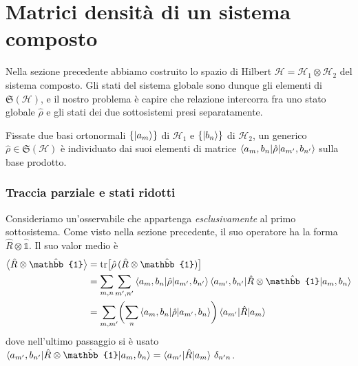 
\chapter{Matrici densità di un sistema composto}

Nella sezione precedente abbiamo costruito lo spazio di Hilbert
$\mathcal{H} = \mathcal{H}_1 \otimes \mathcal{H}_2$ del sistema composto.
Gli stati del sistema globale sono dunque gli elementi di
$\mathfrak{S}(\mathcal{H})$, e il nostro problema è capire che relazione
intercorra fra uno stato globale $\hat{\rho}$ e gli stati dei due
sottosistemi presi separatamente.

Fissate due basi ortonormali $\{\ket{a_m}\}$ di $\mathcal{H}_1$ e
$\{\ket{b_n}\}$ di $\mathcal{H}_2$, un generico $\hat{\rho} \in
\mathfrak{S}(\mathcal{H})$ è individuato dai suoi elementi di matrice
$\braket{a_m, b_n | \hat{\rho} | a_{m'}, b_{n'}}$ sulla base prodotto.

\subsection{Traccia parziale e stati ridotti}

Consideriamo un'osservabile che appartenga \emph{esclusivamente} al primo
sottosistema. Come visto nella sezione precedente, il suo operatore ha la
forma $\hat{R} \otimes \hat{\mathbb{1}}$. Il suo valor medio è
%
\begin{align}
    \bigl\langle \hat{R} \otimes \hat{\mathbb{1}} \bigr\rangle
    &= \operatorname{tr} \bigl[ \hat{\rho} \, (\hat{R} \otimes
       \hat{\mathbb{1}}) \bigr] \nonumber \\
    &= \sum_{m,n} \sum_{m',n'}
       \braket{a_m, b_n | \hat{\rho} | a_{m'}, b_{n'}}
       \braket{a_{m'}, b_{n'} | \hat{R} \otimes \hat{\mathbb{1}} | a_m, b_n}
       \nonumber \\
    &= \sum_{m,m'} \biggl( \sum_n
       \braket{a_m, b_n | \hat{\rho} | a_{m'}, b_n} \biggr)
       \braket{a_{m'} | \hat{R} | a_m}
    \label{eq:media-locale}
\end{align}
%
dove nell'ultimo passaggio si è usato
$\braket{a_{m'}, b_{n'} | \hat{R} \otimes \hat{\mathbb{1}} | a_m, b_n}
= \braket{a_{m'} | \hat{R} | a_m} \, \delta_{n'n}$.


